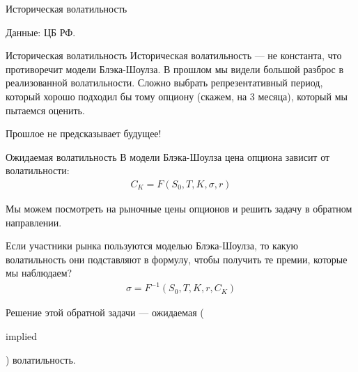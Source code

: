 \documentclass{beamer}
\newcommand{\en}[1]{\begin{otherlanguage}{english}#1\end{otherlanguage}}
\begin{document}
\begin{frame}{Историческая волатильность}
\centering
{}

\scriptsize Данные: ЦБ РФ.
\end{frame}



\begin{frame}{Историческая волатильность}
\justify
Историческая волатильность --- не константа, что противоречит модели Блэка-Шоулза. В прошлом мы видели большой разброс в реализованной волатильности. Сложно выбрать репрезентативный период, который хорошо подходил бы тому опциону (скажем, на 3 месяца), который мы пытаемся оценить.

\justify
Прошлое не предсказывает будущее!
\end{frame}



\begin{frame}{Ожидаемая волатильность}
\justify
В модели Блэка-Шоулза цена опциона зависит от волатильности:
\begin{align*}
C_K = F(S_0, T, K, \sigma, r)
\end{align*}

\justify
Мы можем посмотреть на рыночные цены опционов и решить задачу в обратном направлении. 

\justify
Если участники рынка пользуются моделью Блэка-Шоулза, то какую волатильность они подставляют в формулу, чтобы получить те премии, которые мы наблюдаем?
\begin{align*}
\sigma = F^{-1}(S_0, T, K, r, C_K)
\end{align*}

\justify
Решение этой обратной задачи --- ожидаемая (\en{implied}) волатильность.
\end{frame}
\end{document}
